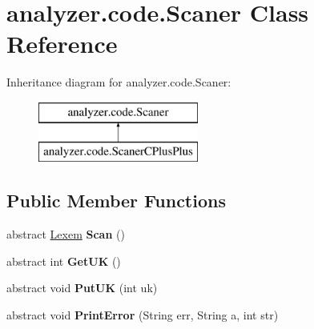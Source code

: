 \hypertarget{classanalyzer_1_1code_1_1Scaner}{}\section{analyzer.\+code.\+Scaner Class Reference}
\label{classanalyzer_1_1code_1_1Scaner}
Inheritance diagram for analyzer.\+code.\+Scaner\+:\begin{figure}[H]
\begin{center}
\leavevmode
\includegraphics[height=2.000000cm]{classanalyzer_1_1code_1_1Scaner}
\end{center}
\end{figure}
\subsection*{Public Member Functions}
\begin{DoxyCompactItemize}
\item 
\mbox{\label{classanalyzer_1_1code_1_1Scaner_ae8ef99f07981cdc050db2ac72b87764c}} 
abstract \hyperlink{classanalyzer_1_1code_1_1Lexem}{Lexem} {\bfseries Scan} ()
\item 
\mbox{\label{classanalyzer_1_1code_1_1Scaner_aa0eead1a1a7e0b57b974fdd82b3ff994}} 
abstract int {\bfseries Get\+UK} ()
\item 
\mbox{\label{classanalyzer_1_1code_1_1Scaner_a3715352096865139df63d8392c77541f}} 
abstract void {\bfseries Put\+UK} (int uk)
\item 
\mbox{\label{classanalyzer_1_1code_1_1Scaner_a868b7448acbe6444ad9bd326949effb1}} 
abstract void {\bfseries Print\+Error} (String err, String a, int str)
\end{DoxyCompactItemize}
